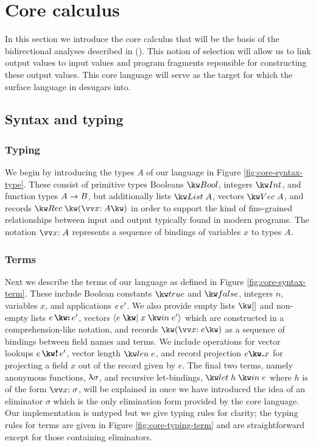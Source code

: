 \newpage

\section{Core calculus}
\label{sec:core-language}

In this section we introduce the core calculus that will be the basis of the bidirectional analyses described in (). This notion of selection will allow us to link output values to input values and program fragments reponsible for constructing these output values. This core language will serve as the target for which the surface language in  desugars into.

\subsection{Syntax and typing}
\label{sec:core-language:syntax-typing}
\subsubsection{Typing}
We begin by introducing the types $A$ of our language in Figure \ref{fig:core-syntax-type}. These consist of primitive types Booleans $\tyBool$, integers $\tyInt$, and function types ${A}\rightarrow{B}$, but additionally lists $\tyList{A}$, vectors $\tyVec{A}$, and records $\tyRec{\vec{\bind{x}{A}}}$ in order to support the kind of fine-grained relationships between input and output typically found in modern programs. The notation $\seq{\bind{x}{A}}$ represents a sequence of bindings of variables $x$ to types $A$.



\subsubsection{Terms}
Next we describe the terms of our language as defined in Figure \ref{fig:core-syntax-term}.  These include Boolean constants $\exTrue$ and $\exFalse$, integers $n$, variables $x$, and applications ${e}\,{e'}$. We also provide empty lists $\exNil$ and non-empty lists $\exCons{e}{e'}$, vectors $\exVec{e}{x}{e'}$ which are constructed in a comprehension-like notation, and records $\exRec{\vec{\bind{x}{e}}}$ as a sequence of bindings between field names and terms. We include operations for vector lookups $\exVecLookup{e}{e'}$, vector length $\exVecLen{e}$, and record projection $\exRecProj{e}{x}$ for projecting a field $x$ out of the record given by $e$. The final two terms, namely anonymous functions, $\uplambda{\sigma}$, and recursive let-bindings, $\exLetRecMutual{h}{e}$ where $h$ is of the form $\vec{\bind{x}{\sigma}}$, will be explained in  once we have introduced the idea of an eliminator $\sigma$ which is the only elimination form provided by the core language. Our implementation is untyped but we give typing rules for clarity; the typing rules for terms are given in Figure \ref{fig:core-typing-term} and are straightforward except for those containing eliminators.

